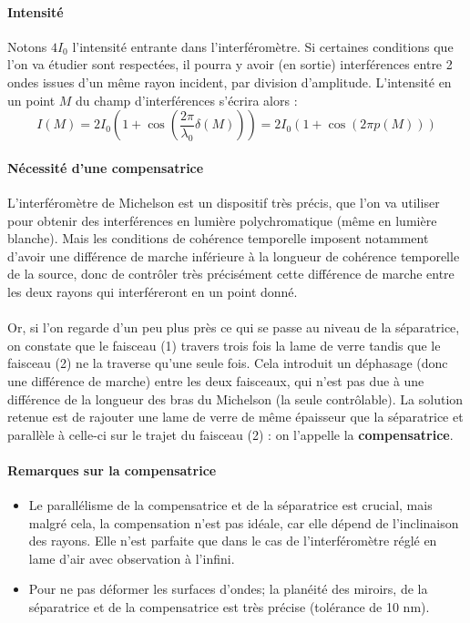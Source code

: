 \documentclass[french]{book}
\theoremstyle{plain}
\theoremstyle{definition}
\theoremstyle{remark}
\begin{document}
\paragraph{Intensité} Notons $4I_0$ l'intensité entrante dans l'interféromètre. Si certaines conditions que l'on va étudier sont respectées, il pourra y avoir (en sortie) interférences entre 2 ondes issues d'un même rayon incident, par division d'amplitude. L'intensité en un point $M$ du champ d'interférences s'écrira alors : $$I(M)=2I_0\left(1+\cos\left(\frac{2\pi}{\lambda_0}\delta(M)\right)\right)=2I_0\left(1+\cos\left(2\pi p(M)\right)\right)$$
\paragraph{Nécessité d'une compensatrice} L'interféromètre de Michelson est un dispositif très précis, que l'on va utiliser pour obtenir des interférences en lumière polychromatique (même en lumière blanche). Mais les conditions de cohérence temporelle imposent notamment d'avoir une différence de marche inférieure à la longueur de cohérence temporelle de la source, donc de contrôler très précisément cette différence de marche entre les deux rayons qui interféreront en un point donné. \\ \\ Or, si l'on regarde d'un peu plus près ce qui se passe au niveau de la séparatrice, on constate que le faisceau (1) travers trois fois la lame de verre tandis que le faisceau (2) ne la traverse qu'une seule fois. Cela introduit un déphasage (donc une différence de marche) entre les deux faisceaux, qui n'est pas due à une différence de la longueur des bras du Michelson (la seule contrôlable). La solution retenue est de rajouter une lame de verre de même épaisseur que la séparatrice et parallèle à celle-ci sur le trajet du faisceau (2) : on l'appelle la \textbf{compensatrice}.
\paragraph{Remarques sur la compensatrice}
\begin{itemize}
	\item Le parallélisme de la compensatrice et de la séparatrice est crucial, mais malgré cela, la compensation n'est pas idéale, car elle dépend de l'inclinaison des rayons. Elle n'est parfaite que dans le cas de l'interféromètre réglé en lame d'air avec observation à l'infini.
	\item Pour ne pas déformer les surfaces d'ondes; la planéité des miroirs, de la séparatrice et de la compensatrice est très précise (tolérance de 10 nm).
\end{itemize}
\end{document}
